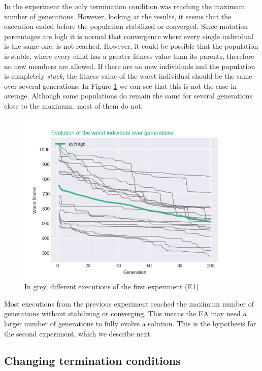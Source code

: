 \documentclass[sigconf]{acmart}
\begin{document}
In the experiment the only termination condition was reaching the maximum 
number of generations. However, looking at the results, it seems that the 
execution ended before the population stabilized or converged. Since mutation 
percentages are high it is normal that convergence where every single 
individual is the same one, is not reached. However, it could be possible that 
the population is stable, where every child has a greater fitness value than 
its parents, therefore no new members are allowed. If there are no new 
individuals and the population is completely \textit{stuck}, the fitness value 
of the worst individual should be the same over several generations. In Figure 
\ref{f:grahp1} we can see that this is not the case in average. Although some 
populations do remain the same for several generations close to the maximum, 
most of them do not.

\begin{figure}[H]
	\centering
	\includegraphics[scale=0.55]{exp1_worstIndv.png}
	\caption{In grey, different executions of the first experiment (E1)}\label{f:grahp1}
\end{figure}

Most executions from the previous experiment reached the maximum number of 
generations without stabilizing or converging. This means the EA may need a 
larger number of generations to fully evolve a solution. This is the hypothesis 
for the second experiment, which we describe next.

\subsection{Changing termination conditions}
\end{document}
